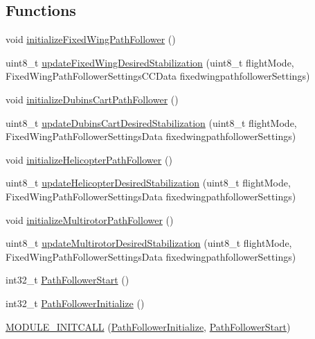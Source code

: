 \subsection*{\-Functions}
\begin{DoxyCompactItemize}
\item 
void \hyperlink{group___path_follower_module_ga7d8eb83e8373b42a40717506c8c953c9}{initialize\-Fixed\-Wing\-Path\-Follower} ()
\item 
uint8\-\_\-t \hyperlink{group___path_follower_module_gaffde0f0e5877288228eb45021034a544}{update\-Fixed\-Wing\-Desired\-Stabilization} (uint8\-\_\-t flight\-Mode, \-Fixed\-Wing\-Path\-Follower\-Settings\-C\-C\-Data fixedwingpathfollower\-Settings)
\item 
void \hyperlink{group___path_follower_module_ga5132cbfe164bb15242a595443d5f14e0}{initialize\-Dubins\-Cart\-Path\-Follower} ()
\item 
uint8\-\_\-t \hyperlink{group___path_follower_module_gae4ebfbf2bba2c443a0875621cdd6a870}{update\-Dubins\-Cart\-Desired\-Stabilization} (uint8\-\_\-t flight\-Mode, \-Fixed\-Wing\-Path\-Follower\-Settings\-Data fixedwingpathfollower\-Settings)
\item 
void \hyperlink{group___path_follower_module_ga1bb2c3bf9c6792e0ff0a042d4c96201e}{initialize\-Helicopter\-Path\-Follower} ()
\item 
uint8\-\_\-t \hyperlink{group___path_follower_module_ga3d17785ce335b62ef6a5c6c3128807a6}{update\-Helicopter\-Desired\-Stabilization} (uint8\-\_\-t flight\-Mode, \-Fixed\-Wing\-Path\-Follower\-Settings\-Data fixedwingpathfollower\-Settings)
\item 
void \hyperlink{group___path_follower_module_ga672d5e0ecf8a7d758f4b787caa6b1ea2}{initialize\-Multirotor\-Path\-Follower} ()
\item 
uint8\-\_\-t \hyperlink{group___path_follower_module_ga31301e7624c476ead7805402b7b221a6}{update\-Multirotor\-Desired\-Stabilization} (uint8\-\_\-t flight\-Mode, \-Fixed\-Wing\-Path\-Follower\-Settings\-Data fixedwingpathfollower\-Settings)
\item 
int32\-\_\-t \hyperlink{group___path_follower_module_ga779f0a705b6a86f7a467d70dd0e91b56}{\-Path\-Follower\-Start} ()
\item 
int32\-\_\-t \hyperlink{group___path_follower_module_gaa4ee6d9af7715845fd300acdf4ee3fbe}{\-Path\-Follower\-Initialize} ()
\item 
\hyperlink{group___path_follower_module_ga12295fff725e85b0b9cab808ded56315}{\-M\-O\-D\-U\-L\-E\-\_\-\-I\-N\-I\-T\-C\-A\-L\-L} (\hyperlink{group___path_follower_module_gaa4ee6d9af7715845fd300acdf4ee3fbe}{\-Path\-Follower\-Initialize}, \hyperlink{group___path_follower_module_ga779f0a705b6a86f7a467d70dd0e91b56}{\-Path\-Follower\-Start})
\end{DoxyCompactItemize}
